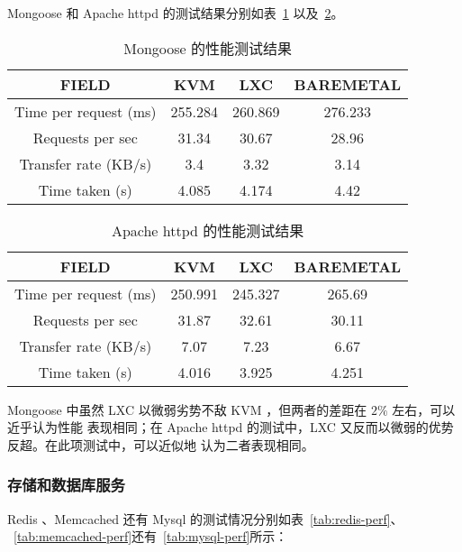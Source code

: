 Mongoose 和 Apache httpd 的测试结果分别如表~\ref{tab:mongoose-perf}
以及~\ref{tab:apache-perf}。

\begin{table}[H]
    \centering
    \caption{Mongoose 的性能测试结果}
    \begin{tabular}{||c c c c||}
        \hline
        FIELD & KVM & LXC & BAREMETAL \\
        \hline
        \hline
        Time per request (ms) & 255.284 & 260.869 & 276.233 \\
        \hline
        Requests per sec & 31.34 & 30.67 & 28.96 \\
        \hline
        Transfer rate (KB/s) & 3.4 & 3.32 & 3.14 \\
        \hline
        Time taken (s) & 4.085 & 4.174 & 4.42 \\
        \hline
    \end{tabular}
    \label{tab:mongoose-perf}
\end{table}

\begin{table}[H]
    \centering
    \caption{Apache httpd 的性能测试结果}
    \begin{tabular}{||c c c c||}
        \hline
        FIELD & KVM & LXC & BAREMETAL \\
        \hline
        \hline
        Time per request (ms) & 250.991 & 245.327 & 265.69 \\
        \hline
        Requests per sec & 31.87 & 32.61 & 30.11 \\
        \hline
        Transfer rate (KB/s) & 7.07 & 7.23 & 6.67 \\
        \hline
        Time taken (s) & 4.016 & 3.925 & 4.251 \\
        \hline
    \end{tabular}
    \label{tab:apache-perf}
\end{table}

Mongoose 中虽然 LXC 以微弱劣势不敌 KVM ，但两者的差距在 $2\%$ 左右，可以近乎认为性能
表现相同；在 Apache httpd 的测试中，LXC 又反而以微弱的优势反超。在此项测试中，可以近似地
认为二者表现相同。

\subsubsection{存储和数据库服务}

Redis 、Memcached 还有 Mysql 的测试情况分别如表~\ref{tab:redis-perf}、
~\ref{tab:memcached-perf}还有~\ref{tab:mysql-perf}所示：

